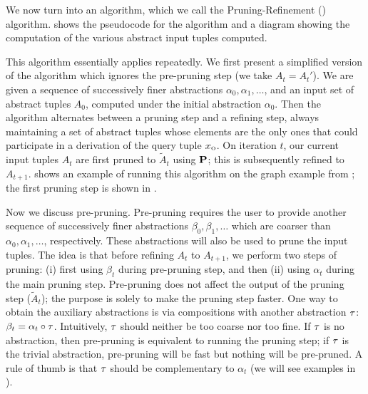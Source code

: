 We now turn  into an algorithm, which we call the
Pruning-Refinement (\PR) algorithm.   shows the pseudocode
for the algorithm and a diagram showing the computation of the various abstract
input tuples computed.

This algorithm essentially applies  repeatedly.
We first present a simplified version of the algorithm which
ignores the pre-pruning step (we take $A_t = A_t'$).
We are given a sequence of successively finer abstractions $\alpha_0, \alpha_1, \dots$,
and an input set of abstract tuples $A_0$, computed
under the initial abstraction $\alpha_0$.  Then the algorithm alternates between a pruning step
and a refining step, always maintaining a set of abstract tuples whose elements are the only 
ones that could participate in a derivation of the query tuple $x_\text{\sc o}$.
On iteration $t$, our current input tuples $A_t$ are first pruned to $\tilde A_t$ using $\mathbf{P}$;
this is subsequently refined to $A_{t+1}$.
 shows an example of running this algorithm on the graph
example from ; the first pruning step is shown in
.


Now we discuss pre-pruning.  Pre-pruning requires the user to provide
another sequence of successively finer abstractions $\beta_0, \beta_1, \dots$
which are coarser than $\alpha_0, \alpha_1, \dots$, respectively.
These abstractions will also be used to prune the input tuples.
The idea is that before refining $A_t$ to $A_{t+1}$,
we perform two steps of pruning:
(i) first using $\beta_t$ during pre-pruning step, and then
(ii) using $\alpha_t$ during the main pruning step.
Pre-pruning does not affect the output of the pruning step ($\tilde A_t$);
the purpose is solely to make the pruning step faster.
One way to obtain the auxiliary abstractions is via
compositions with another abstraction $\tau$: $\beta_t = \alpha_t \circ \tau$.
Intuitively, $\tau$ should neither be too coarse nor too fine.
If $\tau$ is no abstraction, then pre-pruning is equivalent to running the pruning step;
if $\tau$ is the trivial abstraction, pre-pruning will be fast but nothing will be pre-pruned.
A rule of thumb is that $\tau$ should be complementary to $\alpha_t$
(we will see examples in ).

